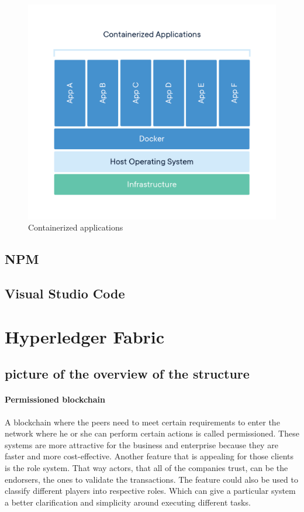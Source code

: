 \documentclass[a4paper,11pt]{report}
\begin{document}
\begin{figure}[h]
\centering
  \includegraphics[width = 16cm]{container-what-is-container.png}
  \caption{ Containerized applications \cite{dockerContainer}}
  \label{dockerEnvironment}
\end{figure}

\section{NPM}

\section{Visual Studio Code}
\label{vsCode}
\chapter{Hyperledger Fabric}
\label{hplFabric}

\section{picture of the overview of the structure}

\subsubsection{Permissioned blockchain}
A blockchain where the peers need to meet certain requirements to enter the network where he or she can perform certain actions is called permissioned. These systems are more attractive for the business and enterprise because they are faster and more cost-effective. Another feature that is appealing for those clients is the role system. That way actors, that all of the companies trust, can be the endorsers, the ones to validate the transactions. The feature could also be used to classify different players into respective roles. Which can give a particular system a better clarification and simplicity around executing different tasks. 
\end{document}
